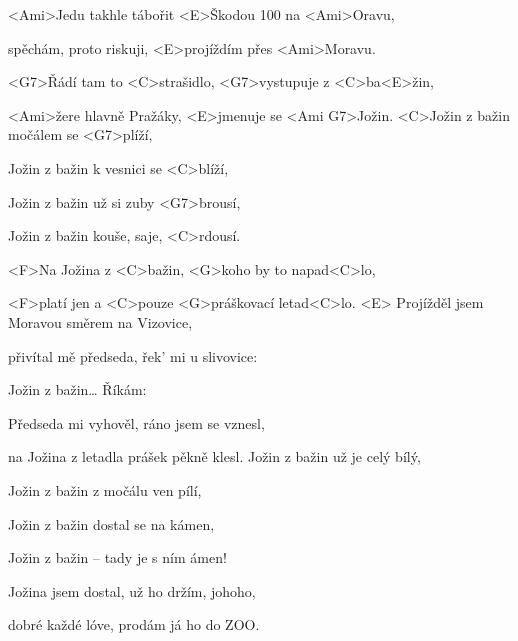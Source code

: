 
\zs
<Ami>Jedu takhle tábořit <E>Škodou 100 na <Ami>Oravu,

spěchám, proto riskuji, <E>projíždím přes <Ami>Moravu.

<G7>Řádí tam to <C>strašidlo, <G7>vystupuje z <C>ba<E>žin,

<Ami>žere hlavně Pražáky, <E>jmenuje se <Ami G7>Jožin.
\ks
\zr
<C>Jožin z bažin močálem se <G7>plíží,

Jožin z bažin k vesnici se <C>blíží,

Jožin z bažin už si zuby <G7>brousí,

Jožin z bažin kouše, saje, <C>rdousí.

<F>Na Jožina z <C>bažin, <G>koho by to napad<C>lo,

<F>platí jen a <C>pouze <G>práškovací letad<C>lo. <E>
\kr
\zs
Projížděl jsem Moravou směrem na Vizovice,

přivítal mě předseda, řek' mi u slivovice:

\ks
\zr
Jožin z bažin…
\kr
\zs
Říkám: 

Předseda mi vyhověl, ráno jsem se vznesl,

na Jožina z letadla prášek pěkně klesl.
\ks
\hvezda
Jožin z bažin už je celý bílý,

Jožin z bažin z močálu ven pílí,

Jožin z bažin dostal se na kámen,

Jožin z bažin – tady je s ním ámen!

Jožina jsem dostal, už ho držím, johoho,

dobré každé lóve, prodám já ho do ZOO.
\kr
\kp
